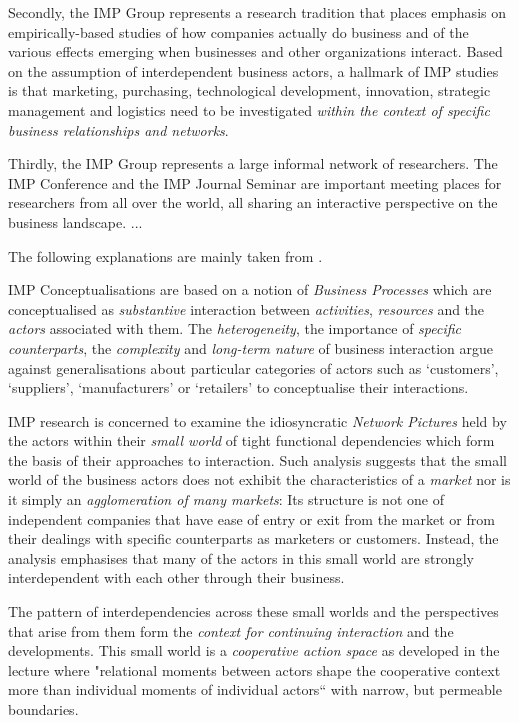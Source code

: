 \documentclass[11pt,a4paper]{article}
\begin{document}
Secondly, the IMP Group represents a research tradition that places emphasis
on empirically-based studies of how companies actually do business and of the
various effects emerging when businesses and other organizations interact.
Based on the assumption of interdependent business actors, a hallmark of IMP
studies is that marketing, purchasing, technological development, innovation,
strategic management and logistics need to be investigated \emph{within the
  context of specific business relationships and networks}.

Thirdly, the IMP Group represents a large informal network of researchers. The
IMP Conference and the IMP Journal Seminar are important meeting places for
researchers from all over the world, all sharing an interactive perspective on
the business landscape. ...

The following explanations are mainly taken from \cite{FordMouzas2013}.

IMP Conceptualisations are based on a notion of \emph{Business Processes}
which are conceptualised as \emph{substantive} interaction between
\emph{activities}, \emph{resources} and the \emph{actors} associated with
them.  The \emph{heterogeneity}, the importance of \emph{speciﬁc
  counterparts}, the \emph{complexity} and \emph{long-term nature} of business
interaction argue against generalisations about particular categories of
actors such as ‘customers’, ‘suppliers’, ‘manufacturers’ or ‘retailers’ to
conceptualise their interactions.

IMP research is concerned to examine the idiosyncratic \emph{Network Pictures}
held by the actors within their \emph{small world} of tight functional
dependencies which form the basis of their approaches to interaction.  Such
analysis suggests that the small world of the business actors does not exhibit
the characteristics of a \emph{market} nor is it simply an \emph{agglomeration
  of many markets}: Its structure is not one of independent companies that
have ease of entry or exit from the market or from their dealings with speciﬁc
counterparts as marketers or customers. Instead, the analysis emphasises that
many of the actors in this small world are strongly interdependent with each
other through their business.

The pattern of interdependencies across these small worlds and the
perspectives that arise from them form the \emph{context for continuing
  interaction} and the developments.  This small world is a \emph{cooperative
  action space} as developed in the lecture where "relational moments between
actors shape the cooperative context more than individual moments of
individual actors“ with narrow, but permeable boundaries.
\end{document}
